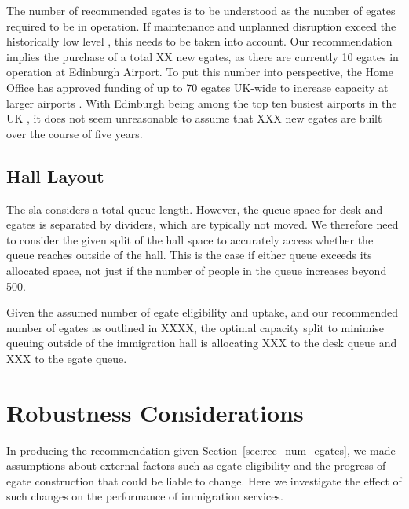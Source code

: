 \documentclass[10pt]{article}
\begin{document}
The number of recommended \glspl{egate} is to be understood as the number of \glspl{egate} required to be in operation. If maintenance and unplanned disruption exceed the historically low level \cite{Inspection_eGates}, this needs to be taken into account. Our recommendation implies the purchase of a total XX new \glspl{egate}, as there are currently 10 \glspl{egate} in operation at Edinburgh Airport. To put this number into perspective, the Home Office has approved funding of up to 70 \glspl{egate} UK-wide to increase capacity at larger airports \cite{Inspection_eGates}. With Edinburgh being among the top ten busiest airports in the UK \cite{busiestairport}, it does not seem unreasonable to assume that XXX new \glspl{egate} are built over the course of five years. 


\subsection{Hall Layout}
The \gls{sla} considers a total queue length. However, the queue space for desk and \glspl{egate} is separated by dividers, which are typically not moved. We therefore need to consider the given split of the hall space to accurately access whether the queue reaches outside of the hall. This is the case if either queue exceeds its allocated space, not just if the number of people in the queue increases beyond 500. 

Given the assumed number of \gls{egate} eligibility and uptake, and our recommended number of \glspl{egate} as outlined in XXXX, the optimal capacity split to minimise queuing outside of the immigration hall is allocating XXX to the desk queue and XXX to the \gls{egate} queue.
 

\section{Robustness Considerations} \label{sec:robustness}
In producing the recommendation given Section~\ref{sec:rec_num_egates}, we made assumptions about external factors such as \gls{egate} eligibility and the progress of \gls{egate} construction that could be liable to change. Here we investigate the effect of such changes on the performance of immigration services.
\end{document}
